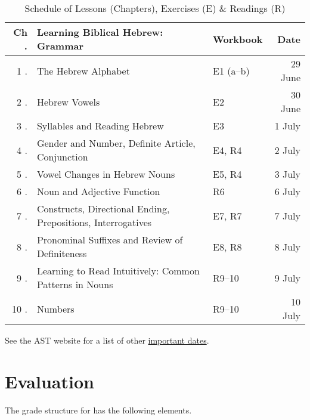 \documentclass[titlepage]{article}
\begin{document}
\begin{table}[htbp]%
  \centering%
  \begin{tabular}{@{}r<{.}@{ }llr}
    \toprule
    \bfseries Ch & \textbf{Learning Biblical Hebrew: Grammar} & \textbf{Workbook} & \textbf{Date} \\
    \midrule
    1  & The Hebrew Alphabet                                          & E1 (a–b) & 29 June \\
    2  & Hebrew Vowels                                                & E2     & 30 June \\
    3  & Syllables and Reading Hebrew                                 & E3     &  1 July \\
    4  & Gender and Number, Definite Article, Conjunction             & E4, R4 &  2 July \\
    5  & Vowel Changes in Hebrew Nouns                                & E5, R4 &  3 July \\
    6  & Noun and Adjective Function                                  & R6     &  6 July \\
    7  & Constructs, Directional Ending, Prepositions, Interrogatives & E7, R7 &  7 July \\
    8  & Pronominal Suffixes and Review of Definiteness               & E8, R8 &  8 July \\
    9  & Learning to Read Intuitively: Common Patterns in Nouns       & R9–10  &  9 July \\
    10 & Numbers                                                      & R9–10  & 10 July \\
    \bottomrule
  \end{tabular}
  \caption{Schedule of Lessons (Chapters), Exercises (E) \& Readings (R)}
  \label{schedule}
\end{table}

See the AST website for a list of other \href{http://www.astheology.ns.ca/students/academic-dates.html}{important dates}.

\section{Evaluation}
\label{evaluation}

The grade structure for \ccode has the following elements.
\end{document}
